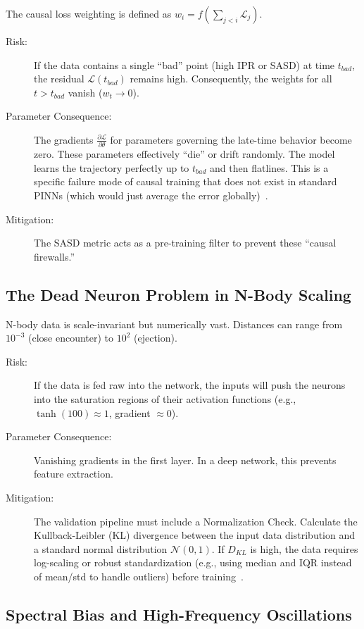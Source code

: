 \documentclass[11pt, a4paper]{article}
\begin{document}
The causal loss weighting is defined as $w_i = f(\sum_{j<i} \mathcal{L}_j)$.
\begin{description}
    \item[Risk:] If the data contains a single ``bad'' point (high IPR or SASD) at time $t_{bad}$, the residual $\mathcal{L}(t_{bad})$ remains high. Consequently, the weights for all $t > t_{bad}$ vanish ($w_t \to 0$).
    \item[Parameter Consequence:] The gradients $\frac{\partial \mathcal{L}}{\partial \theta}$ for parameters governing the late-time behavior become zero. These parameters effectively ``die'' or drift randomly. The model learns the trajectory perfectly up to $t_{bad}$ and then flatlines. This is a specific failure mode of causal training that does not exist in standard PINNs (which would just average the error globally)~\cite{ref10}.
    \item[Mitigation:] The SASD metric acts as a pre-training filter to prevent these ``causal firewalls.''
\end{description}

\subsection{The Dead Neuron Problem in N-Body Scaling}

N-body data is scale-invariant but numerically vast. Distances can range from $10^{-3}$ (close encounter) to $10^2$ (ejection).
\begin{description}
    \item[Risk:] If the data is fed raw into the network, the inputs will push the neurons into the saturation regions of their activation functions (e.g., $\tanh(100) \approx 1$, gradient $\approx 0$).
    \item[Parameter Consequence:] Vanishing gradients in the first layer. In a deep network, this prevents feature extraction.
    \item[Mitigation:] The validation pipeline must include a Normalization Check. Calculate the Kullback-Leibler (KL) divergence between the input data distribution and a standard normal distribution $\mathcal{N}(0, 1)$. If $D_{KL}$ is high, the data requires log-scaling or robust standardization (e.g., using median and IQR instead of mean/std to handle outliers) before training~\cite{ref13}.
\end{description}

\subsection{Spectral Bias and High-Frequency Oscillations}
\end{document}
